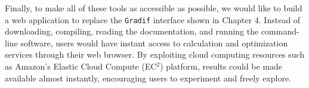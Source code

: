 Finally, to make all of these tools as accessible as possible, we would like to build a web application to replace the \texttt{Gradif} interface shown in Chapter 4.  Instead of downloading, compiling, reading the documentation, and running the command-line software, users would have instant access to calculation and optimization services through their web browser.  By exploiting cloud computing resources such as Amazon's Elastic Cloud Compute (EC$^2$) platform, results could be made available almost instantly, encouraging users to experiment and freely explore.